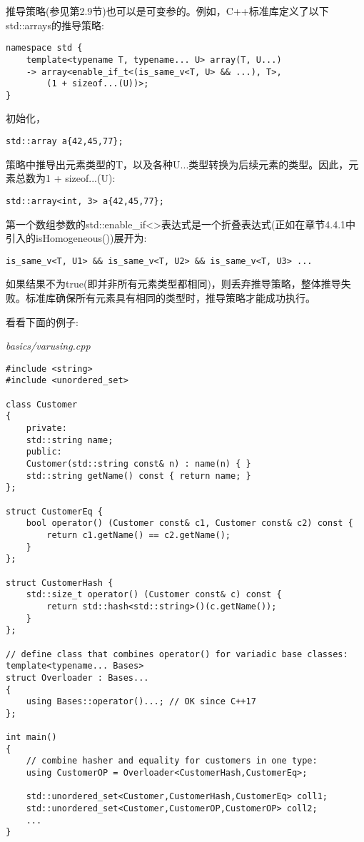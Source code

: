 推导策略(参见第2.9节)也可以是可变参的。例如，C++标准库定义了以下std::arrays的推导策略:

\begin{lstlisting}[style=styleCXX]
namespace std {
	template<typename T, typename... U> array(T, U...)
	-> array<enable_if_t<(is_same_v<T, U> && ...), T>,
		(1 + sizeof...(U))>;
}
\end{lstlisting}

初始化，

\begin{lstlisting}[style=styleCXX]
std::array a{42,45,77};
\end{lstlisting}

策略中推导出元素类型的T，以及各种U...类型转换为后续元素的类型。因此，元素总数为1 + sizeof...(U):

\begin{lstlisting}[style=styleCXX]
std::array<int, 3> a{42,45,77};
\end{lstlisting}

第一个数组参数的std::enable\_if<>表达式是一个折叠表达式(正如在章节4.4.1中引入的isHomogeneous())展开为:

\begin{lstlisting}[style=styleCXX]
is_same_v<T, U1> && is_same_v<T, U2> && is_same_v<T, U3> ...
\end{lstlisting}

如果结果不为true(即并非所有元素类型都相同)，则丢弃推导策略，整体推导失败。标准库确保所有元素具有相同的类型时，推导策略才能成功执行。


看看下面的例子:

\noindent
\textit{basics/varusing.cpp}
\begin{lstlisting}[style=styleCXX]
#include <string>
#include <unordered_set>

class Customer
{
	private:
	std::string name;
	public:
	Customer(std::string const& n) : name(n) { }
	std::string getName() const { return name; }
};

struct CustomerEq {
	bool operator() (Customer const& c1, Customer const& c2) const {
		return c1.getName() == c2.getName();
	}
};

struct CustomerHash {
	std::size_t operator() (Customer const& c) const {
		return std::hash<std::string>()(c.getName());
	}
};

// define class that combines operator() for variadic base classes:
template<typename... Bases>
struct Overloader : Bases...
{
	using Bases::operator()...; // OK since C++17
};

int main()
{
	// combine hasher and equality for customers in one type:
	using CustomerOP = Overloader<CustomerHash,CustomerEq>;
	
	std::unordered_set<Customer,CustomerHash,CustomerEq> coll1;
	std::unordered_set<Customer,CustomerOP,CustomerOP> coll2;
	...
}
\end{lstlisting}

